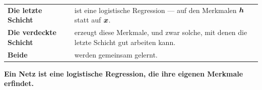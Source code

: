 \begin{merksatz}
\begin{center}
\end{center}

\begin{center}
{\small
\renewcommand{\arraystretch}{1.5}
\begin{tabular}{@{}P{2.6cm}P{6.0cm}@{}}
\toprule
\textbf{Die letzte Schicht} & ist eine logistische Regression --- auf den Merkmalen $\boldsymbol{h}$ statt auf $\boldsymbol{x}$.\\
\textbf{Die verdeckte Schicht} & erzeugt diese Merkmale, und zwar solche, mit denen die letzte Schicht gut arbeiten kann.\\
\textbf{Beide} & werden gemeinsam gelernt.\\
\bottomrule
\end{tabular}}
\end{center}

\begin{center}
\begin{minipage}{0.9\textwidth}
\textbf{Ein Netz ist eine logistische Regression, die ihre eigenen Merkmale erfindet.}
\end{minipage}
\end{center}
\end{merksatz}

